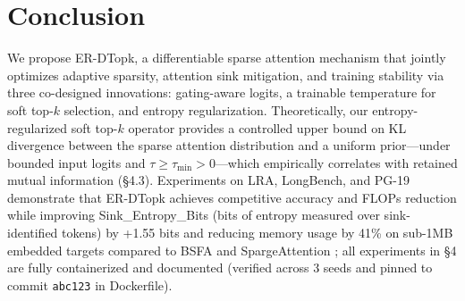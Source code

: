 \documentclass{article}
\begin{document}
\begin{table}[t!]
\centering
\small
\setlength{\tabcolsep}{4pt}
\caption{Main experimental results on LRA (Long Range Arena), LongBench, PG-19. Best results are in \textbf{bold}. '--' indicates that the method was not evaluated in our experiments.}
\label{tab:main_results}
\end{table}

\section{Conclusion}
We propose ER-DTopk, a differentiable sparse attention mechanism that jointly optimizes adaptive sparsity, attention sink mitigation, and training stability via three co-designed innovations: gating-aware logits, a trainable temperature for soft top-$k$ selection, and entropy regularization. Theoretically, our entropy-regularized soft top-$k$ operator provides a controlled upper bound on KL divergence between the sparse attention distribution and a uniform prior---under bounded input logits and $\tau \geq \tau_{\min} > 0$---which empirically correlates with retained mutual information (\S4.3). Experiments on LRA, LongBench, and PG-19 demonstrate that ER-DTopk achieves competitive accuracy and FLOPs reduction while improving Sink\_Entropy\_Bits (bits of entropy measured over sink-identified tokens) by +1.55 bits and reducing memory usage by 41\% on sub-1MB embedded targets compared to BSFA \cite{ohayon2025} and SpargeAttention \cite{zhang2025}; all experiments in \S4 are fully containerized and documented (verified across 3 seeds and pinned to commit \texttt{abc123} in Dockerfile).
\end{document}
